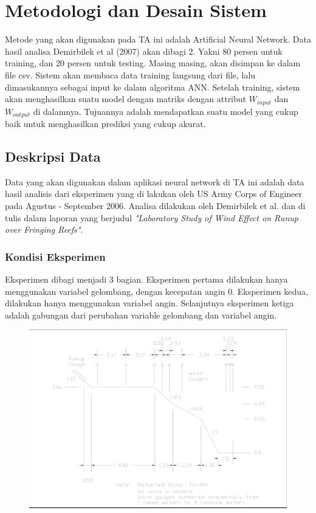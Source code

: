 \chapter{Metodologi dan Desain Sistem}
  Metode yang akan digunakan pada TA ini adalah Artificial Neural Network. Data hasil analisa Demirbilek et al (2007) \cite{DemirbilekReport} akan dibagi 2. Yakni 80 persen untuk training, dan 20 persen untuk testing. Masing masing, akan disimpan ke dalam file csv. Sistem akan membaca data training langsung dari file, lalu dimasukannya sebagai input ke dalam algoritma ANN. Setelah training, sistem akan menghasilkan suatu model dengan matriks dengan attribut $W_{input}$ dan $W_{output}$ di dalamnya. Tujuannya adalah mendapatkan suatu model yang cukup baik untuk menghasilkan prediksi yang cukup akurat.

\section{Deskripsi Data}
Data yang akan digunakan dalam aplikasi neural network di TA ini adalah data hasil analisis dari eksperimen yang di lakukan oleh US Army Corps of Engineer pada Agustus - September 2006. Analisa dilakukan oleh Demirbilek et al. dan di tulis dalam laporan yang berjudul \emph{"Laboratory Study of Wind Effect on Runup over Fringing Reefs"}.

\subsection{Kondisi Eksperimen}
\label{kondisiEksperimen}

Eksperimen dibagi menjadi 3 bagian. Eksperimen pertama dilakukan hanya menggunakan variabel gelombang, dengan kecepatan angin 0. Eksperimen kedua, dilakukan hanya menggunakan variabel angin. Selanjutnya eksperimen ketiga adalah gabungan dari perubahan variable gelombang dan variabel angin.

\begin{figure}
  \begin{center}
    \includegraphics[scale=0.2]{./images/instrumen_eksperimen.png}
  \end{center}
  \caption{}
\end{figure}
\FloatBarrier

